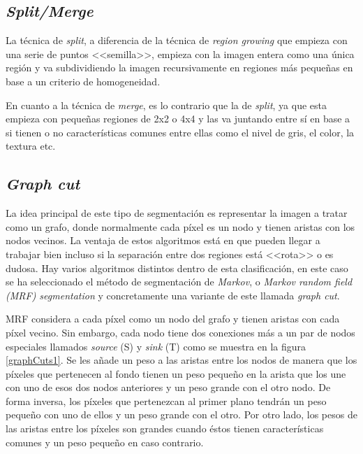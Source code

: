 \subsection{\textit{Split/Merge}}

La t\'{e}cnica de \textit{split}, a diferencia de la t\'{e}cnica de \textit{region growing} que empieza con una serie de puntos <<semilla>>, empieza con la imagen entera como una \'{u}nica regi\'{o}n y va subdividiendo la imagen recursivamente en regiones m\'{a}s peque\~{n}as en base a un criterio de homogeneidad.

En cuanto a la t\'{e}cnica de \textit{merge}, es lo contrario que la de \textit{split}, ya que esta empieza con peque\~{n}as regiones de 2x2 o 4x4 y las va juntando entre s\'{i} en base a si tienen o no caracter\'{i}sticas comunes entre ellas como el nivel de gris, el color, la textura etc.

\subsection{\textit{Graph cut}}

La idea principal de este tipo de segmentaci\'{o}n es representar la imagen a tratar como un grafo, donde normalmente cada p\'{i}xel es un nodo y tienen aristas con los nodos vecinos. La ventaja de estos algoritmos est\'{a} en que pueden llegar a trabajar bien incluso si la separaci\'{o}n entre dos regiones est\'{a} <<rota>> o es dudosa. Hay varios algoritmos distintos dentro de esta clasificaci\'{o}n, en este caso se ha seleccionado el m\'{e}todo de segmentaci\'{o}n de \textit{Markov}, o \textit{Markov random field (MRF) segmentation} y concretamente una variante de este llamada \textit{graph cut}. 

MRF considera a cada p\'{i}xel como un nodo del grafo y tienen aristas con cada p\'{i}xel vecino. Sin embargo, cada nodo tiene dos conexiones m\'{a}s a un par de nodos especiales llamados \textit{source} (S) y \textit{sink} (T) como se muestra en la figura \ref{graphCuts1}. Se les a\~{n}ade un peso a las aristas entre los nodos de manera que los p\'{i}xeles que pertenecen al fondo tienen un peso peque\~{n}o en la arista que los une con uno de esos dos nodos anteriores y un peso grande con el otro nodo. De forma inversa, los p\'{i}xeles que pertenezcan al primer plano tendr\'{a}n un peso peque\~{n}o con uno de ellos y un peso grande con el otro. Por otro lado, los pesos de las aristas entre los p\'{i}xeles son grandes cuando \'{e}stos tienen caracter\'{i}sticas comunes y un peso peque\~{n}o en caso contrario.

